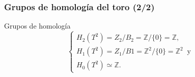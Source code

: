 \documentclass[11pt]{beamer}
\begin{document}
\begin{frame}
\frametitle{Grupos de homología del toro (2/2)}

	\begin{alertblock}{Grupos de homología}
		\begin{equation*}
			\begin{cases}
				H_2(T^2)=Z_2/B_2 = \mathbb{Z}/\{0\} = \mathbb{Z},\\[6pt]
				H_1(T^2)=Z_1/B1= \mathbb{Z}^2/\{0\} = \mathbb{Z}^2 ~\text{ y }~ \\[6pt]
				H_0(T^2)\simeq \mathbb{Z}.
			\end{cases}
		\end{equation*}
	\end{alertblock}

\end{frame}
\end{document}
